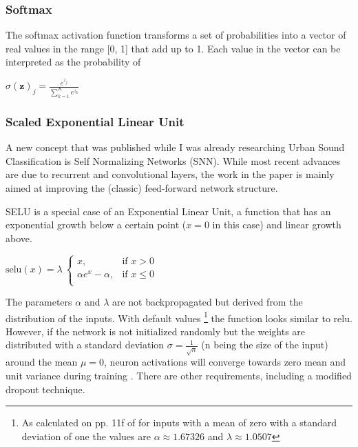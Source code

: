 
\subsubsection{Softmax}
The softmax activation function transforms a set of probabilities into a vector of real values in the range [0, 1] that add up to 1. Each value in the vector can be interpreted as the probability of 

{\centering
	$\displaystyle \sigma (\mathbf {z} )_{j}={\frac {e^{z_{j}}}{\sum _{k=1}^{K}e^{z_{k}}}}$
	\par
}


\subsubsection{Scaled Exponential Linear Unit}

A new concept that was published while I was already researching Urban Sound Classification is Self Normalizing Networks (SNN). While most recent advances are due to  recurrent and convolutional layers, the work in the paper \cite{DBLP:journals/corr/KlambauerUMH17} is mainly aimed at improving the (classic) feed-forward network structure.

SELU is a special case of an Exponential Linear Unit, a function that has an exponential growth below a certain point ($x = 0$ in this case) and linear growth above. 
 


{\centering
	$\displaystyle \text{selu}(x) = \lambda\ \begin{cases}
    x,& \text{if } x > 0\\
    \alpha e^{x} - \alpha,& \text{if } x\leq 0\\
	\end{cases}$
	\par
}

The parameters $\alpha$ and $\lambda$ are not backpropagated but derived from the distribution of the inputs.
With default values
\footnote{
As calculated on pp. 11f of \cite{DBLP:journals/corr/KlambauerUMH17} for inputs with a mean of zero with a standard deviation of one the values are
 \(\alpha \approx 1.67326\) and  \(\lambda \approx 1.0507\) }
the function looks similar to relu. However, if the network is not initialized randomly but the weights are distributed with a standard deviation $\sigma = \frac{1}{\sqrt{n}}$ (n being the size of the input) around the mean $\mu = 0$, neuron activations will converge towards zero mean and unit variance during training \cite{DBLP:journals/corr/KlambauerUMH17}. There are other requirements, including a modified dropout technique.

